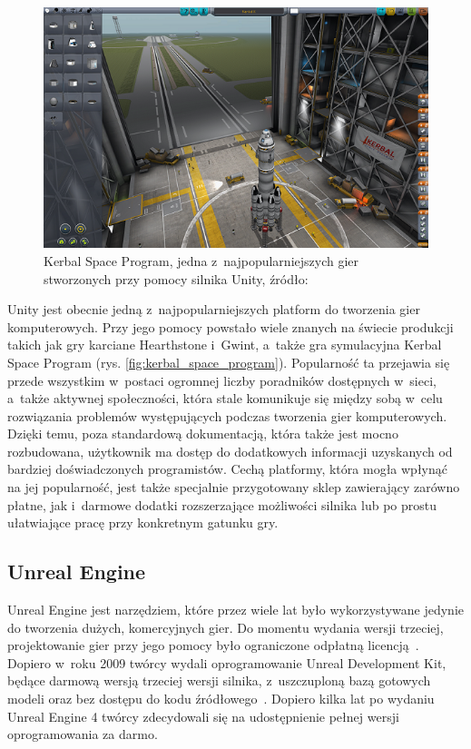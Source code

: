 \begin{figure}[h]
	\centering
	\includegraphics[width=0.7\linewidth]{images/kerbal_space_program.png}
	\caption{Kerbal Space Program, jedna z~najpopularniejszych gier stworzonych przy pomocy silnika Unity, źródło:~\cite{kerbal_your_enthusiasm}}
	\label{fig:kerbal_spaów wysokopoziomowych.ce_program}
\end{figure}

Unity jest obecnie jedną z~najpopularniejszych platform do tworzenia gier komputerowych. Przy jego pomocy powstało wiele znanych na świecie produkcji takich jak gry karciane Hearthstone i~Gwint, a~także gra symulacyjna Kerbal Space Program (rys. \ref{fig:kerbal_space_program}). Popularność ta przejawia się przede wszystkim w~postaci ogromnej liczby poradników dostępnych w~sieci, a~także aktywnej społeczności, która stale komunikuje się między sobą w~celu rozwiązania problemów występujących podczas tworzenia gier komputerowych. Dzięki temu, poza standardową dokumentacją, która także jest mocno rozbudowana, użytkownik ma dostęp do dodatkowych informacji uzyskanych od bardziej doświadczonych programistów. Cechą platformy, która mogła wpłynąć na jej popularność, jest także specjalnie przygotowany sklep zawierający zarówno płatne, jak i~darmowe dodatki rozszerzające możliwości silnika lub po prostu ułatwiające pracę przy konkretnym gatunku gry.

\subsection{Unreal Engine}
Unreal Engine jest narzędziem, które przez wiele lat było wykorzystywane jedynie do tworzenia dużych, komercyjnych gier. Do momentu wydania wersji trzeciej, projektowanie gier przy jego pomocy było ograniczone odpłatną licencją~\cite{unreal_manual}. Dopiero w~roku 2009 twórcy wydali oprogramowanie Unreal Development Kit, będące darmową wersją trzeciej wersji silnika, z~uszczuploną bazą gotowych modeli oraz bez dostępu do kodu źródłowego~\cite{udk_manual}. Dopiero kilka lat po wydaniu Unreal Engine 4 twórcy zdecydowali się na udostępnienie pełnej wersji oprogramowania za darmo. 

